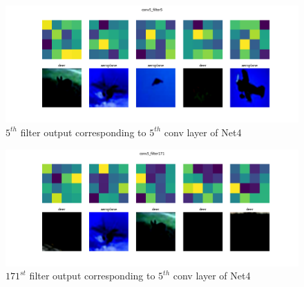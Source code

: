\documentclass{article}
\begin{document}
\begin{figure}[ht]
	\centering
	\includegraphics[scale=0.4]{../code/images/Filter_conv5_filter5.png}
	\caption{$5^{th}$ filter output corresponding to $5^{th}$ conv layer of Net4}
	\label{fig:c5f5}
\end{figure}

\begin{figure}[ht]
	\centering
	\includegraphics[scale=0.4]{../code/images/Filter_conv5_filter171.png}
	\caption{$171^{st}$ filter output corresponding to $5^{th}$ conv layer of Net4}
	\label{fig:c5f171}
\end{figure}
\clearpage
\end{document}
